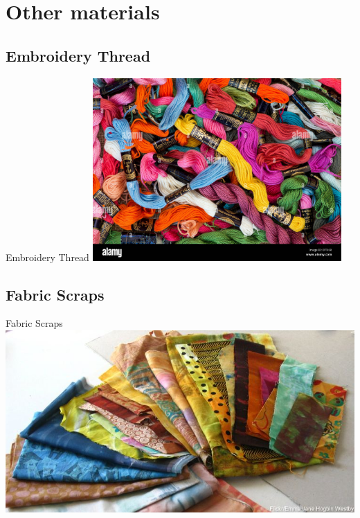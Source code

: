 \documentclass[aspectratio=169]{beamer}
\begin{document}
\section{Other materials}
\frame{\tableofcontents[hideothersubsections,sectionstyle=show/hide]}
\subsection{Embroidery Thread}
\begin{frame}[fragile]{Embroidery Thread}
\includegraphics[height=2.75in]{embroiderythreads.jpg}
\end{frame}
\subsection{Fabric Scraps}
\begin{frame}[fragile]{Fabric Scraps}
\includegraphics[height=2.75in]{FabricScraps.jpg}
\end{frame}
\end{document}
